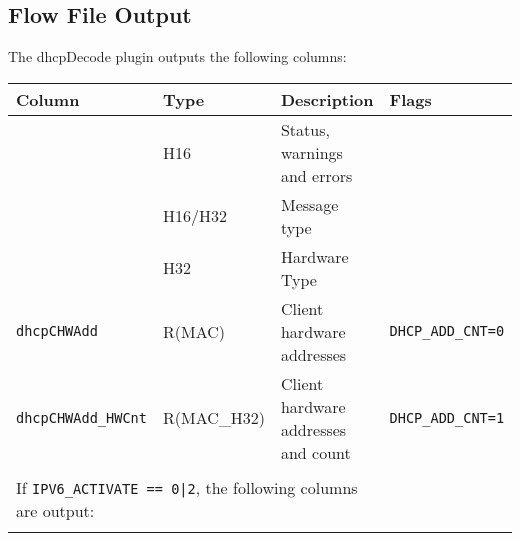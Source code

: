 \documentclass[documentation]{subfiles}
\begin{document}
\subsection{Flow File Output}
The dhcpDecode plugin outputs the following columns:
\begin{longtable}{llll}
    \toprule
    {\bf Column} & {\bf Type} & {\bf Description} & {\bf Flags}\\
    \midrule\endhead%
    {\tt\nameref{dhcpStat}}   & H16           & Status, warnings and errors\\
    {\tt\nameref{dhcpMType}}  & H16/H32       & Message type                        & \\
    {\tt\nameref{dhcpHWType}} & H32           & Hardware Type                       & \\
    {\tt dhcpCHWAdd}          & R(MAC)        & Client hardware addresses           & {\tt DHCP\_ADD\_CNT=0}\\
    {\tt dhcpCHWAdd\_HWCnt}   & R(MAC\_H32)   & Client hardware addresses and count & {\tt DHCP\_ADD\_CNT=1}\\\\

    \multicolumn{3}{l}{If {\tt IPV6\_ACTIVATE == 0|2}, the following columns are output:}\\\\


\end{longtable}
\end{document}
